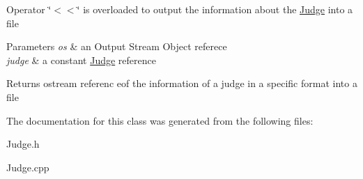 Operator \char`\"{}$<$$<$\char`\"{} is overloaded to output the information about the \hyperlink{class_judge}{Judge} into a file 
\begin{DoxyParams}{Parameters}
{\em os} & an Output Stream Object referece \\
\hline
{\em judge} & a constant \hyperlink{class_judge}{Judge} reference \\
\hline
\end{DoxyParams}
\begin{DoxyReturn}{Returns}
ostream referenc eof the information of a judge in a specific format into a file 
\end{DoxyReturn}


The documentation for this class was generated from the following files\+:\begin{DoxyCompactItemize}
\item 
Judge.\+h\item 
Judge.\+cpp\end{DoxyCompactItemize}
